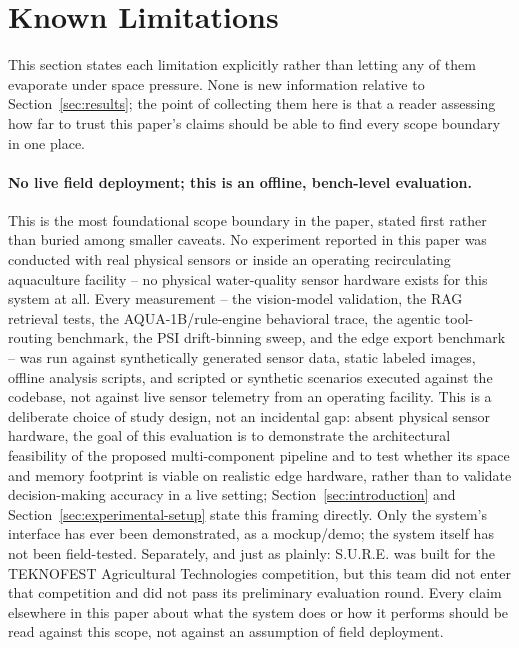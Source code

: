 \section{Known Limitations}
\label{sec:known-limitations}

This section states each limitation explicitly rather than letting any of them evaporate under
space pressure. None is new information relative to Section~\ref{sec:results}; the point of
collecting them here is that a reader assessing how far to trust this paper's claims should be
able to find every scope boundary in one place.

\paragraph{No live field deployment; this is an offline, bench-level evaluation.} This is the most
foundational scope boundary in the paper, stated first rather than buried among smaller caveats. No
experiment reported in this paper was conducted with real physical sensors or inside an operating
recirculating aquaculture facility -- no physical water-quality sensor hardware exists for this
system at all. Every measurement -- the vision-model validation, the RAG retrieval tests, the
AQUA-1B/rule-engine behavioral trace, the agentic tool-routing benchmark, the PSI drift-binning
sweep, and the edge export benchmark -- was run against synthetically generated sensor data, static
labeled images, offline analysis scripts, and scripted or synthetic scenarios executed against the
codebase, not against live sensor telemetry from an operating facility. This is a deliberate choice
of study design, not an incidental gap: absent physical sensor hardware, the goal of this evaluation
is to demonstrate the architectural feasibility of the proposed multi-component pipeline and to test
whether its space and memory footprint is viable on realistic edge hardware, rather than to validate
decision-making accuracy in a live setting; Section~\ref{sec:introduction} and
Section~\ref{sec:experimental-setup} state this framing directly. Only the system's interface has
ever been demonstrated, as a mockup/demo; the system itself has not been field-tested. Separately,
and just as plainly: S.U.R.E. was built for the TEKNOFEST Agricultural Technologies competition, but
this team did not enter that competition and did not pass its preliminary evaluation round. Every
claim elsewhere in this paper about what the system does or how it performs should be read against
this scope, not against an assumption of field deployment.

